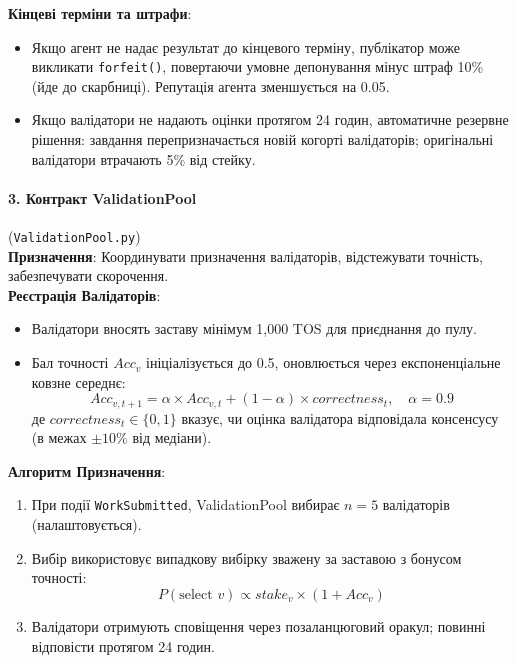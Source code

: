 \documentclass[11pt]{article}
\begin{document}
\textbf{Кінцеві терміни та штрафи}:
\begin{itemize}[noitemsep]
  \item Якщо агент не надає результат до кінцевого терміну, публікатор може викликати \texttt{forfeit()}, повертаючи умовне депонування мінус штраф 10\% (йде до скарбниці). Репутація агента зменшується на 0.05.
  \item Якщо валідатори не надають оцінки протягом 24 годин, автоматичне резервне рішення: завдання перепризначається новій когорті валідаторів; оригінальні валідатори втрачають 5\% від стейку.
\end{itemize}

\paragraph{3. Контракт ValidationPool} (\texttt{ValidationPool.py})\\
\textbf{Призначення}: Координувати призначення валідаторів, відстежувати точність, забезпечувати скорочення.\\
\textbf{Реєстрація Валідаторів}:
\begin{itemize}[noitemsep]
  \item Валідатори вносять заставу мінімум 1,000 TOS для приєднання до пулу.
  \item Бал точності $Acc_v$ ініціалізується до 0.5, оновлюється через експоненціальне ковзне середнє:
    \begin{equation}
    Acc_{v,t+1} = \alpha \times Acc_{v,t} + (1-\alpha) \times correctness_t, \quad \alpha = 0.9
    \end{equation}
    де $correctness_t \in \{0,1\}$ вказує, чи оцінка валідатора відповідала консенсусу (в межах $\pm10\%$ від медіани).
\end{itemize}
\textbf{Алгоритм Призначення}:
\begin{enumerate}[noitemsep]
  \item При події \texttt{WorkSubmitted}, ValidationPool вибирає $n=5$ валідаторів (налаштовується).
  \item Вибір використовує випадкову вибірку зважену за заставою з бонусом точності:
    \begin{equation}
    P(\text{select } v) \propto stake_v \times (1 + Acc_v)
    \end{equation}
  \item Валідатори отримують сповіщення через позаланцюговий оракул; повинні відповісти протягом 24 годин.
\end{enumerate}
\end{document}
